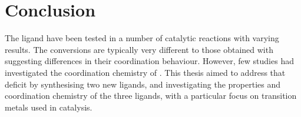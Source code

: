 
\chapter{Conclusion}
\label{ch:conclusion}


The \tBuXantphos{} ligand have been tested in a number of catalytic reactions with varying results.  The conversions are typically very different to those obtained with \Phxantphos{} suggesting differences in their coordination behaviour.  However, few studies had investigated the coordination chemistry of \tBuxantphos{}.  This thesis aimed to address that deficit by synthesising two new \tBuxantphos{} ligands, and investigating the properties and coordination chemistry of the three ligands, with a particular focus on transition metals used in catalysis.  



